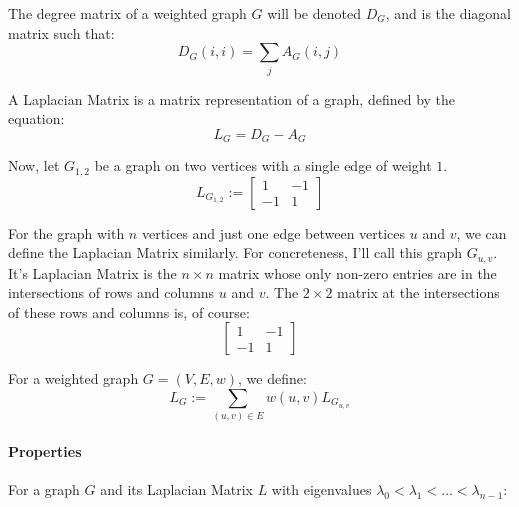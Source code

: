 The degree matrix of a weighted graph $G$ will be denoted $D_{G}$, and is the
diagonal matrix such that:
\begin{displaymath}
D_{G}(i,i) = \sum_{j} A_{G}(i,j)
\end{displaymath}

A Laplacian Matrix is a matrix representation of a graph, defined by the
equation:
\begin{displaymath}
L_{G} = D_{G} - A_{G}
\end{displaymath}

Now, let $G_{1,2}$ be a graph on two vertices with a single edge of weight $1$.
\begin{displaymath}
L_{G_{1,2}} :=
    \begin{bmatrix}
        1 & -1 \\
        -1 & 1
    \end{bmatrix}
\end{displaymath}

For the graph with $n$ vertices and just one edge between vertices $u$ and $v$, 
we can define the Laplacian Matrix similarly. For concreteness, I'll call this
graph $G_{u,v}$. It's Laplacian Matrix is the $n{\times}n$ matrix whose only 
non-zero entries are in the intersections of rows and columns $u$ and $v$. The 
$2{\times}2$ matrix at the intersections of these rows and columns is, of 
course:
\begin{displaymath}
    \begin{bmatrix}
        1 & -1 \\
        -1 & 1
    \end{bmatrix}
\end{displaymath}

For a weighted graph $G = (V,E,w)$, we define:
\begin{displaymath}
L_{G} := \sum_{(u,v) \in E} w(u,v)L_{G_{u,v}}
\end{displaymath}

\paragraph{Properties}
For a graph $G$ and its Laplacian Matrix $L$ with eigenvalues $\lambda_{0} < 
\lambda_{1} < \ldots < \lambda_{n-1}$:

